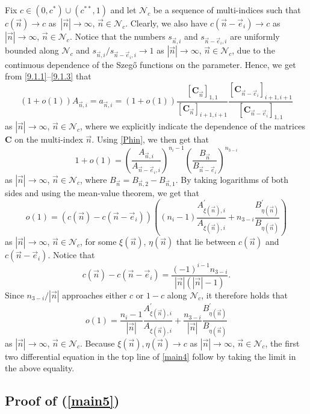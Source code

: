 \documentclass[10pt,a4paper]{amsart}
\numberwithin{equation}{section}
\newcommand{\n}{{\vec n}}
\begin{document}
Fix $ c \in (0,c^*) \cup (c^{**},1) $ and let $ \mathcal N_c $ be a sequence of multi-indices such that $ c(\n) \to c $ as~$ {|\n| \to\infty }$, $ \n\in \mathcal N_c $. Clearly, we also have $ c(\n-\vec e_i) \to c $ as $ |\n| \to\infty $, $ \n\in \mathcal N_c $. Notice that the numbers $ s_{\n,i} $ and $ s_{\n-\vec e_i,i} $ are uniformly bounded along $ \mathcal N_c $ and $ s_{\n,i}/s_{\n-\vec e_i,i}\to 1 $ as $ |\n| \to\infty $, $ \n\in \mathcal N_c $, due to the continuous dependence of the Szeg\H{o} functions on the parameter. Hence, we get from \eqref{9.1.1}--\eqref{9.1.3} that
\[
(1+o(1))A_{\n,i} = a_{\n,i} = (1+o(1))\frac{[\boldsymbol C_\n]_{1,1}}{[\boldsymbol C_\n]_{i+1,i+1}}\frac{[\boldsymbol C_{\n-\vec e_i}]_{i+1,i+1}}{[\boldsymbol C_{\n-\vec e_i}]_{1,1}}
\]
as $ |\n| \to\infty $, $ \n\in \mathcal N_c $, where we explicitly indicate the dependence of the matrices $ \boldsymbol C $ on the multi-index $ \n $. Using \eqref{Phin}, we then get that
\[
1+o(1) = \left( \frac{A_{\n,i}}{A_{\n-\vec e_i,i}} \right)^{n_i-1} \left( \frac{B_\n}{B_{\n-\vec e_i}} \right)^{n_{3-i}}
\]
as $ |\n| \to\infty $, $ \n\in \mathcal N_c $, where $ B_\n = B_{\n,2} - B_{\n,1} $. By taking logarithms of both sides and using the mean-value theorem, we get that
\[
o(1) = (c(\n) - c(\n-\vec e_i)) \left((n_i-1) \frac{A_{\xi(\n),i}^\prime}{A_{\xi(\n),i}} + n_{3-i} \frac{B_{\eta(\n)}^\prime}{B_{\eta(\n)}} \right)
\]
as $ |\n| \to\infty $, $ \n\in \mathcal N_c $, for some $ \xi(\n)$, $\eta(\n) $ that lie between $ c(\n) $ and $ c(\n-\vec e_i) $. Notice that
\[
c(\n) - c(\n-\vec e_i) = \frac{(-1)^{i-1} n_{3-i}}{|\n|(|\n|-1)}.
\]
Since $ n_{3-i}/|\n| $ approaches either $ c $ or $ 1-c $ along $ \mathcal N_c $, it therefore holds that
\[
o(1) = \frac{n_i-1}{|\n|}\frac{A_{\xi(\n),i}^\prime}{A_{\xi(\n),i}} + \frac{n_{3-i}}{|\n|} \frac{B_{\eta(\n)}^\prime}{B_{\eta(\n)}}
\]
as $ |\n| \to\infty $, $ \n\in \mathcal N_c $. Because $ \xi(\n),\eta(\n) \to c $ as $ |\n| \to\infty $, $ \n\in \mathcal N_c $, the first two differential equation in the top line of \eqref{main4} follow by taking the limit in the above equality.

\subsection[Proof of (1.35)]{Proof of (\ref{main5})}
\end{document}
